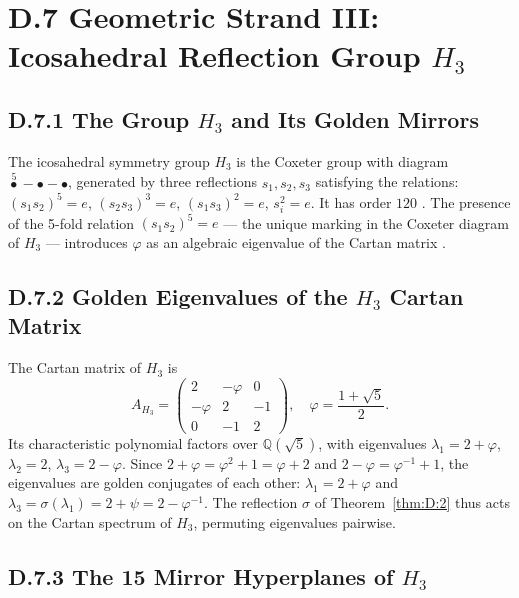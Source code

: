 \section*{D.7  Geometric Strand III: Icosahedral Reflection Group $H_3$}

\subsection*{D.7.1  The Group $H_3$ and Its Golden Mirrors}

The icosahedral symmetry group $H_3$ is the Coxeter group with diagram
$\overset{5}{\bullet} - \bullet - \bullet$, generated by three reflections
$s_1, s_2, s_3$ satisfying the relations:
$(s_1 s_2)^5 = e$, $(s_2 s_3)^3 = e$, $(s_1 s_3)^2 = e$, $s_i^2 = e$.
It has order $120$ \cite{coxeter_regular_polytopes}.
The presence of the 5-fold relation $(s_1 s_2)^5 = e$ — the unique marking in
the Coxeter diagram of $H_3$ — introduces $\varphi$ as an algebraic eigenvalue
of the Cartan matrix \cite{coxeter_regular_polytopes}.

\subsection*{D.7.2  Golden Eigenvalues of the $H_3$ Cartan Matrix}

The Cartan matrix of $H_3$ is
\[
  A_{H_3} = \begin{pmatrix}
    2 & -\varphi & 0 \\
    -\varphi & 2 & -1 \\
    0 & -1 & 2
  \end{pmatrix}, \quad \varphi = \frac{1+\sqrt{5}}{2}.
\]
Its characteristic polynomial factors over $\mathbb{Q}(\sqrt{5})$, with eigenvalues
$\lambda_1 = 2 + \varphi$, $\lambda_2 = 2$, $\lambda_3 = 2 - \varphi$.
Since $2 + \varphi = \varphi^2 + 1 = \varphi + 2$ and $2 - \varphi = \varphi^{-1} + 1$,
the eigenvalues are golden conjugates of each other:
$\lambda_1 = 2+\varphi$ and $\lambda_3 = \sigma(\lambda_1) = 2+\psi = 2-\varphi^{-1}$.
The reflection $\sigma$ of Theorem~\ref{thm:D:2} thus acts on the Cartan spectrum
of $H_3$, permuting eigenvalues pairwise.

\subsection*{D.7.3  The 15 Mirror Hyperplanes of $H_3$}

